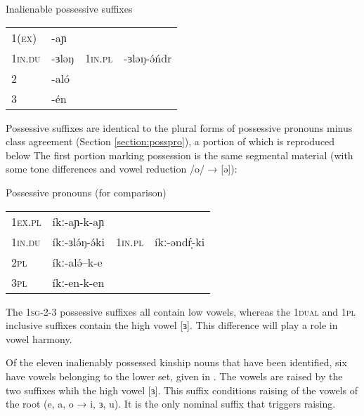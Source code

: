 \ea Inalienable possessive suffixes\\
\begin{tabular}[t]{llll}
1(\textsc{ex}) &	-aɲ	&	& 	\\
1\textsc{in.du}	& -ɜləŋ	&  1\textsc{in.pl}	&  -ɜləŋ-ə́ńdr\\
2	& -aló	& & 	\\
3	&  -én & & \\
\end{tabular}
\z
Possessive suffixes are identical to the plural forms of possessive pronouns minus class agreement (Section \ref{section:posspro}), a portion of which is reproduced below The first portion marking possession is the same segmental material (with some tone differences and vowel reduction /o/ → [ə]):

\ea Possessive pronouns (for comparison)\\
\begin{tabular}[t]{llll}
1\textsc{ex.pl}	 & íkː-aɲ-k-aɲ & & \\
1\textsc{in.du} &	íkː-ɜlə́ŋ-ə́ki & 1\textsc{in.pl} &	íkː-əndŕ̩-ki\\
2\textsc{pl} & 	íkː-alə́--k-e	&  & \\
3\textsc{pl}	& íkː-en-k-en & & \\
\end{tabular}
\z 
The 1\textsc{sg-}2-3 possessive suffixes all contain low vowels, whereas the 1\textsc{dual} and 1\textsc{pl} inclusive suffixes contain the high vowel [ɜ]. This difference will play a role in vowel harmony.

Of the eleven inalienably possessed kinship nouns that have been identified, six have vowels belonging to the lower set, given in . The vowels are raised by the two suffixes whih the high vowel [ɜ]. This suffix conditions raising of the vowels of the root (e, a, o → i, ɜ, u). It is the only nominal suffix that triggers raising.  %

